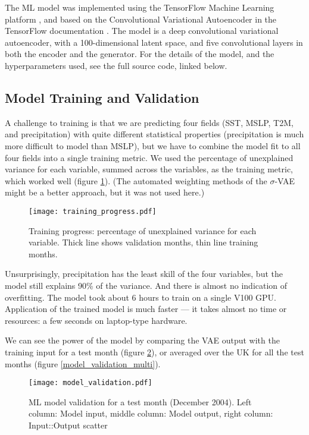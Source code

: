 \documentclass{ametsocV6.1}
\begin{document}
The ML model was implemented using the TensorFlow Machine Learning platform \citep{tensorflow2015-whitepaper}, and based on the Convolutional Variational Autoencoder in the TensorFlow documentation \citep{TF_CVAE}. The model is a deep convolutional variational autoencoder, with a 100-dimensional latent space, and five convolutional layers in both the encoder and the generator. For the details of the model, and the hyperparameters used, see the full source code, linked below.

\subsection{Model Training and Validation}

A challenge to training is that we are predicting four fields (SST, MSLP, T2M, and precipitation) with quite different statistical properties (precipitation is much more difficult to model than MSLP), but we have to combine the model fit to all four fields into a single training metric. We used the percentage of unexplained variance for each variable, summed across the variables, as the training metric, which worked well (figure \ref{training_progress}). (The automated weighting methods of the $\sigma$-VAE \citep{sigma-VAE} might be a better approach, but it was not used here.)



\begin{figure}[h]
\texttt{[image: training\_progress.pdf]}
\caption{Training progress: percentage of unexplained variance for each variable. Thick line shows validation months, thin line training months.}
\label{training_progress}
\end{figure}
    
Unsurprisingly, precipitation has the least skill of the four variables, but the model still explains 90\% of the variance. And there is almost no indication of overfitting. The model took about 6 hours to train on a single V100 GPU. Application of the trained model is much faster --- it takes almost no time or resources: a few seconds on laptop-type hardware.

We can see the power of the model by comparing the VAE output with the training input for a test month (figure \ref{model_validation}), or averaged over the UK for all the test months (figure \ref{model_validation_multi}).

\begin{figure}[h]
\texttt{[image: model\_validation.pdf]}
\caption{ML model validation for a test month (December 2004). Left column: Model input, middle column: Model output, right column: Input::Output scatter}
\label{model_validation}
\end{figure}
\end{document}
